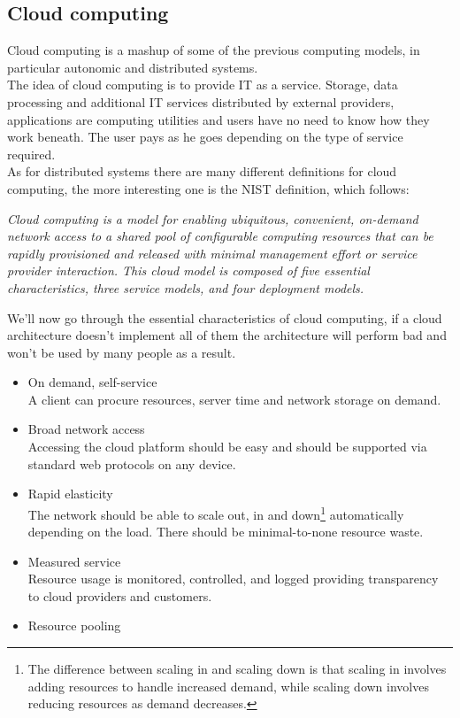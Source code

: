 \subsection{Cloud computing}
Cloud computing is a mashup of some of the previous computing models, in particular autonomic and distributed systems. \\
The idea of cloud computing is to provide IT as a service. Storage, data processing and additional IT services distributed by external providers, applications are computing utilities and users have no need to know how they work beneath. The user pays as he goes depending on the type of service required. \\
As for distributed systems there are many different definitions for cloud computing, the more interesting one is the NIST definition, which follows:
\begin{center}
    \textit{Cloud computing is a model for enabling ubiquitous, convenient, on-demand network access to a shared pool of configurable computing resources that can be rapidly provisioned and released with minimal management effort or service provider interaction. This cloud model is composed of five essential characteristics, three service models, and four deployment models.}
\end{center}
We'll now go through the essential characteristics of cloud computing, if a cloud architecture doesn't implement all of them the architecture will perform bad and won't be used by many people as a result.
\begin{itemize}
    \item On demand, self-service \\
    A client can procure resources, server time and network storage on demand.
    \item Broad network access \\
    Accessing the cloud platform should be easy and should be supported via standard web protocols on any device.
    \item Rapid elasticity \\
    The network should be able to scale out, in and down\footnote{
        The difference between scaling in and scaling down is that scaling in involves adding resources to handle increased demand, while scaling down involves reducing resources as demand decreases.
    } automatically depending on the load. There should be minimal-to-none resource waste.
    \item Measured service \\
    Resource usage is monitored, controlled, and logged providing transparency to cloud providers and customers.
    \item Resource pooling
\end{itemize}
